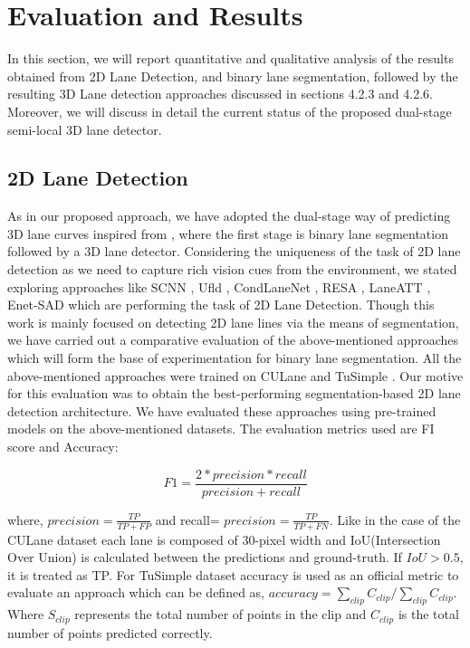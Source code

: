 

    \chapter{Evaluation and Results}
    
    In this section, we will report quantitative and qualitative analysis of the results obtained from 2D Lane Detection, and binary lane segmentation, followed by the resulting 3D Lane detection approaches discussed in sections 4.2.3 and 4.2.6. Moreover, we will discuss in detail the current status of the proposed dual-stage semi-local 3D lane detector. 
    
    \section{2D Lane Detection}
    As in our proposed approach, we have adopted the dual-stage way of predicting 3D lane curves inspired from \cite{guo2020gen}, where the first stage is binary lane segmentation followed by a 3D lane detector. Considering the uniqueness of the task of 2D lane detection as we need to capture rich vision cues from the environment, we stated exploring approaches like SCNN \cite{pan2018SCNN}, Ufld \cite{DBLP:journals/corr/abs-2004-11757}, CondLaneNet \cite{DBLP:journals/corr/abs-2105-05003}, RESA \cite{DBLP:journals/corr/abs-2008-13719},  LaneATT \cite{https://doi.org/10.48550/arxiv.2010.12035}, Enet-SAD \cite{DBLP:journals/corr/abs-1908-00821} which are performing the task of 2D Lane Detection. Though this work is mainly focused on detecting 2D lane lines via the means of segmentation, we have carried out a comparative evaluation of the above-mentioned approaches which will form the base of experimentation for binary lane segmentation. All the above-mentioned approaches were trained on  CULane \cite{pan2018SCNN} and TuSimple \cite{Tusimple}. Our motive for this evaluation was to obtain the best-performing segmentation-based 2D lane detection architecture. We have evaluated these approaches using pre-trained models on the above-mentioned datasets. The evaluation metrics used are FI score and Accuracy: 
    
    \begin{equation}
        F1 = \frac{2*precision * recall}{precision + recall}
    \end{equation}
    
where, $precision = \frac{TP}{TP + FP}$ and recall= $precision = \frac{TP}{TP + FN}$. Like in the case of the CULane \cite{pan2018SCNN} dataset each lane is composed of 30-pixel width and IoU(Intersection Over Union) is calculated between the predictions and ground-truth. If $IoU > 0.5$, it is treated as TP. 
For TuSimple dataset accuracy is used as an official metric to evaluate an approach which can be defined as, $accuracy = \sum_{clip} C_{clip} / \sum_{clip} C_{clip}$. Where $S_{clip}$ represents the total number of points in the clip and $C_{clip}$ is the total number of points predicted correctly. 

